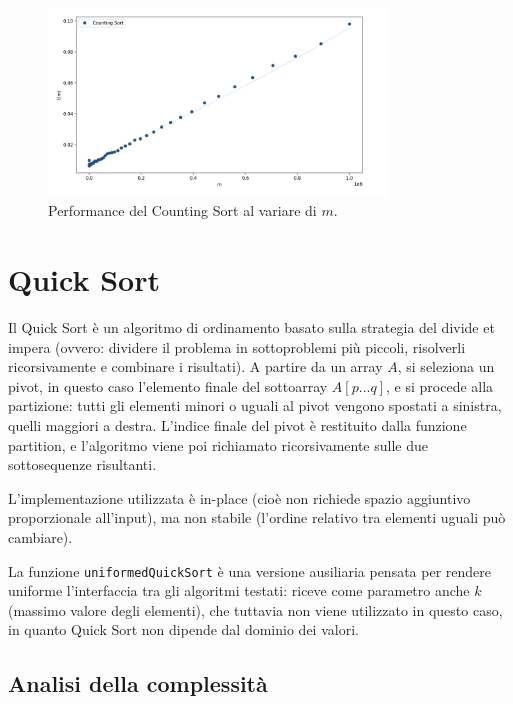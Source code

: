 \documentclass[a4paper, 12pt, oneside]{book}
\begin{document}
\begin{figure}[H]
    \centering
    \includegraphics[width=0.8\textwidth]{images/grafico_counting_sort_m.png}
    \caption{Performance del Counting Sort al variare di \(m\).}
    \label{fig:counting_sort_m}
\end{figure}


\chapter{Quick Sort}\label{chap:Quick Sort} %

Il Quick Sort è un algoritmo di ordinamento basato sulla strategia del divide et impera (ovvero: dividere il problema in sottoproblemi più piccoli, risolverli ricorsivamente e combinare i risultati).
A partire da un array \(A\), si seleziona un pivot, in questo caso l'elemento finale del sottoarray \(A[p...q]\), e si procede alla partizione: tutti gli elementi minori o uguali al pivot vengono spostati a sinistra, quelli maggiori a destra. L'indice finale del pivot è restituito dalla funzione partition, e l'algoritmo viene poi richiamato ricorsivamente sulle due sottosequenze risultanti.

L'implementazione utilizzata è in-place (cioè non richiede spazio aggiuntivo proporzionale all'input), ma non stabile (l'ordine relativo tra elementi uguali può cambiare).

La funzione \texttt{uniformedQuickSort} è una versione ausiliaria pensata per rendere uniforme l'interfaccia tra gli algoritmi testati: riceve come parametro anche \(k\) (massimo valore degli elementi), che tuttavia non viene utilizzato in questo caso, in quanto Quick Sort non dipende dal dominio dei valori.

\section{Analisi della complessità}
\end{document}
